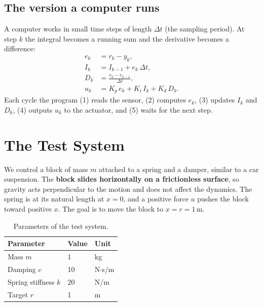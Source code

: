 \documentclass[]{article}
\begin{document}
\subsection{The version a computer runs}
A computer works in small time steps of length $\Delta t$ (the sampling period). At step $k$ the integral becomes a running sum and the derivative becomes a difference:
\begin{align}
	e_k &= r_k - y_k, \\
	I_k &= I_{k-1} + e_k\, \Delta t, \\
	D_k &= \frac{e_k - e_{k-1}}{\Delta t}, \\
	u_k &= K_p\, e_k + K_i\, I_k + K_d\, D_k .
	\label{eq:pid-discrete}
\end{align}
Each cycle the program (1) reads the sensor, (2) computes $e_k$, (3) updates $I_k$ and $D_k$, (4) outputs $u_k$ to the actuator, and (5) waits for the next step.


\section{The Test System}
We control a block of mass $m$ attached to a spring and a damper, similar to a car suspension. The \textbf{block slides horizontally on a frictionless surface}, so gravity acts perpendicular to the motion and does not affect the dynamics. The spring is at its natural length at $x=0$, and a positive force $u$ pushes the block toward positive $x$. The goal is to move the block to $x = r = 1$\,m.

\begin{table}[h]
	\centering
	\begin{tabular}{lll}
		\hline
		Parameter & Value & Unit \\
		\hline
		Mass $m$ & 1 & kg \\
		Damping $c$ & 10 & N$\cdot$s/m \\
		Spring stiffness $k$ & 20 & N/m \\
		Target $r$ & 1 & m \\
		\hline
	\end{tabular}
	\caption{Parameters of the test system.}
\end{table}
\end{document}
